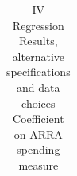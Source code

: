 \begin{table}
\caption[\emph{Jan24IVResults} \newline ManyPrograms]
	{IV Regression Results, alternative specifications and data choices \\ Coefficient on ARRA spending measure}
\label{IVRegressions}
\begin{center}
    \begin{tabular}{  p{2.75in}  c  c  c  }
    
    \end{tabular}
\\
\end{center}
\end{table} 
